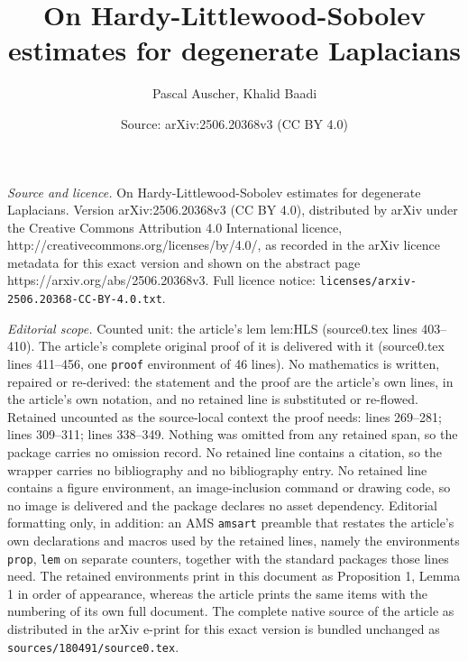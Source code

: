 \documentclass[10pt,a4paper]{amsart}
\title{On Hardy-Littlewood-Sobolev estimates for degenerate Laplacians}
\author{Pascal Auscher, Khalid Baadi}
\date{Source: arXiv:2506.20368v3 (CC BY 4.0)}
\begin{document}
\maketitle

\noindent\emph{Source and licence.} On Hardy-Littlewood-Sobolev estimates for degenerate Laplacians. Version arXiv:2506.20368v3 (CC BY 4.0), distributed by arXiv under the Creative Commons Attribution 4.0 International licence, http://creativecommons.org/licenses/by/4.0/, as recorded in the arXiv licence metadata for this exact version and shown on the abstract page https://arxiv.org/abs/2506.20368v3. Full licence notice: \texttt{licenses/arxiv-2506.20368-CC-BY-4.0.txt}.\par\smallskip

\noindent\textit{Editorial scope.} Counted unit: the article's lem lem:HLS (source0.tex lines 403--410). The article's complete original proof of it is delivered with it (source0.tex lines 411--456, one \texttt{proof} environment of 46 lines). No mathematics is written, repaired or re-derived: the statement and the proof are the article's own lines, in the article's own notation, and no retained line is substituted or re-flowed.  Retained uncounted as the source-local context the proof needs: lines 269--281; lines 309--311; lines 338--349.  Nothing was omitted from any retained span, so the package carries no omission record.  No retained line contains a citation, so the wrapper carries no bibliography and no bibliography entry.  No retained line contains a figure environment, an image-inclusion command or drawing code, so no image is delivered and the package declares no asset dependency.  Editorial formatting only, in addition: an AMS \texttt{amsart} preamble that restates the article's own declarations and macros used by the retained lines, namely the environments \texttt{prop}, \texttt{lem} on separate counters, together with the standard packages those lines need.  The retained environments print in this document as Proposition 1, Lemma 1 in order of appearance, whereas the article prints the same items with the numbering of its own full document.  The complete native source of the article as distributed in the arXiv e-print for this exact version is bundled unchanged as \texttt{sources/180491/source0.tex}.
\end{document}
